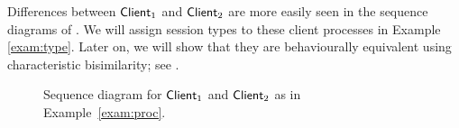 \begin{example}
%
%
%

Differences between $\mathsf{Client}_1$ and $\mathsf{Client}_2$ are more easily seen in the sequence diagrams of . 
We will assign session types to these client processes in Example \ref{exam:type}.
Later on, we will show that they are behaviourally equivalent using characteristic bisimilarity;
see .
\begin{figure}

\caption{Sequence diagram for $\mathsf{Client}_1$ and $\mathsf{Client}_2$ as in Example~\ref{exam:proc}\label{fig:exam}.}
\vspace{-5mm}
\end{figure}
\end{example}
